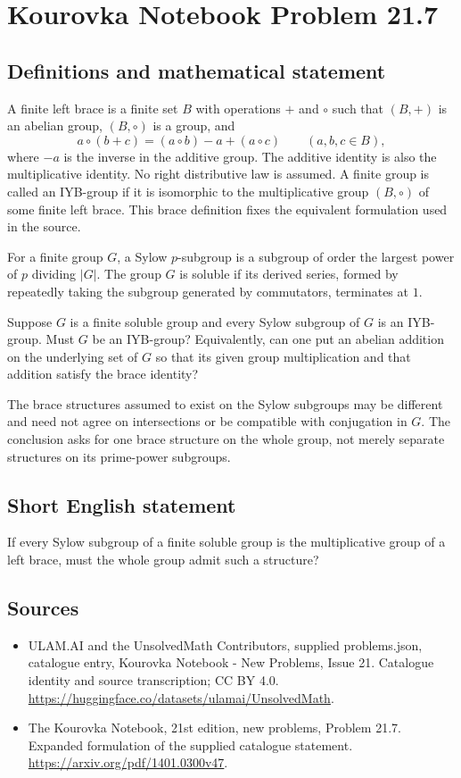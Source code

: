 \documentclass[11pt,a4paper]{article}
\begin{document}
\section*{Kourovka Notebook Problem 21.7}\label{statement}

\subsection{Definitions and mathematical statement}
A finite left brace is a finite set $B$ with operations $+$ and $\circ$
such that $(B,+)$ is an abelian group, $(B,\circ)$ is a group, and
\[
 a\circ(b+c)=(a\circ b)-a+(a\circ c)
                       \qquad(a,b,c\in B),
\]
where $-a$ is the inverse in the additive group. The additive identity
is also the multiplicative identity. No right distributive law is
assumed. A finite group is called an IYB-group if it is isomorphic to
the multiplicative group $(B,\circ)$ of some finite left brace.
This brace definition fixes the equivalent formulation used in the source.

For a finite group $G$, a Sylow $p$-subgroup is a subgroup of order the
largest power of $p$ dividing $|G|$. The group $G$ is soluble if its
derived series, formed by repeatedly taking the subgroup generated by
commutators, terminates at $1$.

Suppose $G$ is a finite soluble group and every Sylow subgroup of $G$
is an IYB-group. Must $G$ be an IYB-group? Equivalently, can one put an
abelian addition on the underlying set of $G$ so that its given group
multiplication and that addition satisfy the brace identity?

The brace structures assumed to exist on the Sylow subgroups may be
different and need not agree on intersections or be compatible with
conjugation in $G$. The conclusion asks for one brace structure on the
whole group, not merely separate structures on its prime-power subgroups.
\subsection{Short English statement}
If every Sylow subgroup of a finite soluble group is the multiplicative group of a left brace, must the whole group admit such a structure?
\subsection{Sources}
\begin{itemize}
\item[S1] ULAM.AI and the UnsolvedMath Contributors, supplied problems.json, catalogue entry, Kourovka Notebook - New Problems, Issue 21. Catalogue identity and source transcription; CC BY 4.0.
\url{https://huggingface.co/datasets/ulamai/UnsolvedMath}.
\item[S2] The Kourovka Notebook, 21st edition, new problems, Problem 21.7. Expanded formulation of the supplied catalogue statement.
\url{https://arxiv.org/pdf/1401.0300v47}.
\end{itemize}
\end{document}
